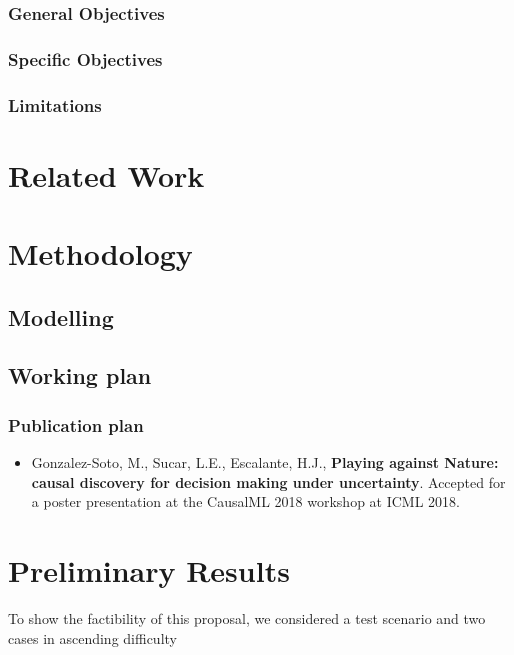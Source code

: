 \documentclass[11pt]{article}
\theoremstyle{plain}
\begin{document}
		\subsubsection{General Objectives}
		\subsubsection{Specific Objectives}
		\subsubsection{Limitations}

\section{Related Work}

\section{Methodology}
\subsection{Modelling}
\subsection{Working plan}
\subsubsection{Publication plan}
\begin{itemize}
\item Gonzalez-Soto, M., Sucar, L.E., Escalante, H.J., \textbf{Playing against Nature: causal discovery for decision making under uncertainty}. Accepted for a poster presentation at the CausalML 2018 workshop at ICML 2018.
\end{itemize}

\section{Preliminary Results}
To show the factibility of this proposal, we considered a test scenario and two cases in ascending difficulty
\newpage


\end{document}
